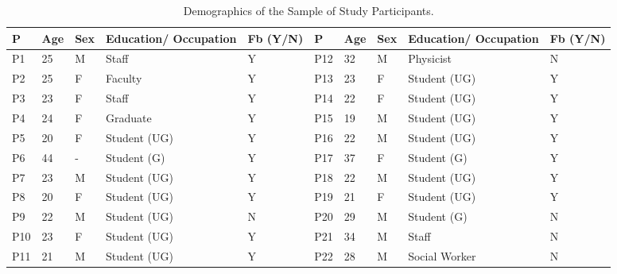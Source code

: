 \begin{table}[!htb]
   
      \centering
        \begin{tabular}{ |p{0.5cm}||p{0.5cm}|p{0.5cm}|p{2cm}|p{0.6cm}||p{0.5cm}||p{0.5cm}|p{0.5cm}|p{2cm}|p{0.6cm}|}
\hline
 P & Age & Sex & Education/ Occupation & Fb (Y/N) & P & Age & Sex & Education/ Occupation & Fb (Y/N)\\
 \hline
 P1&25&M&Staff&Y&P12&32&M&Physicist&N\\ 
 P2&25&F&Faculty&Y&P13&23&F&Student (UG)&Y\\ 
 P3&23&F&Staff&Y&P14&22&F&Student (UG)&Y\\ 
 P4&24&F&Graduate&Y&P15&19&M&Student (UG)&Y\\ 
 P5&20&F&Student (UG)&Y&P16&22&M&Student (UG)&Y\\ 
 P6&44&-&Student (G)&Y&P17&37&F&Student (G)&Y\\ 
 P7&23&M&Student (UG)&Y&P18&22&M&Student (UG)&Y\\ 
 P8&20&F&Student (UG)&Y&P19&21&F&Student (UG)&Y\\ 
 P9&22&M&Student (UG)&N&P20&29&M&Student (G)&N\\
 P10&23&F&Student (UG)&Y&P21&34&M&Staff&N\\
 P11&21&M&Student (UG)&Y&P22&28&M&Social Worker&N\\ 
\hline
\end{tabular}
    \caption{Demographics of the Sample of Study Participants.}
 \label{tab:participants}
  \vspace{-5mm}
   \vspace{-5mm}
\end{table}


